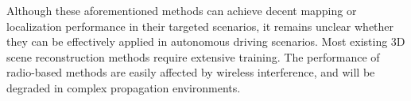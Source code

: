 {Although these aforementioned methods can achieve decent mapping or localization performance in their targeted scenarios, it remains unclear whether they can be effectively applied in autonomous driving scenarios. Most existing 3D scene reconstruction methods require extensive training. The performance of radio-based methods are easily affected by wireless interference, and will be degraded in complex propagation environments. }